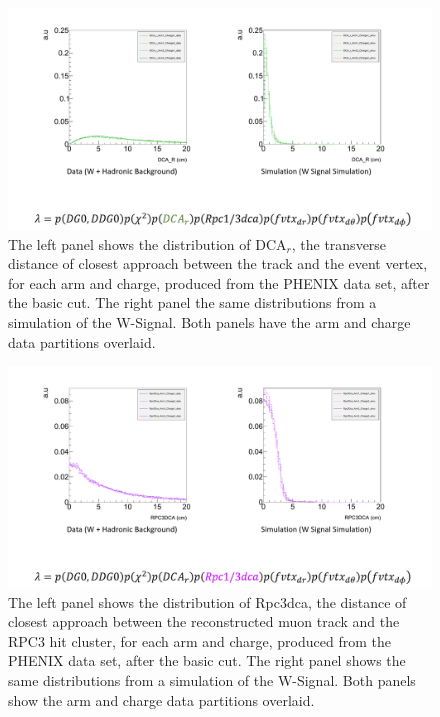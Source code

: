 \begin{figure}[h!]
  \centering
  \includegraphics[width=\linewidth,trim=4 70 4 4,clip]{./figures/pdf_dcar.png}
  \caption{
    The left panel shows the distribution of DCA$_r$, the transverse distance of
    closest approach between the track and the event vertex, for each arm and
    charge, produced from the PHENIX data set, after the basic cut. The right
    panel the same distributions from a simulation of the W-Signal. Both panels
    have the arm and charge data partitions overlaid.
  }
\end{figure}
\clearpage

\begin{figure}[h!]
  \centering
  \includegraphics[width=\linewidth,trim=4 70 4 4,clip]{./figures/pdf_rpc3dca.png}
  \caption{
    The left panel shows the distribution of Rpc3dca, the distance of closest
    approach between the reconstructed muon track and the RPC3 hit cluster, for
    each arm and charge, produced from the PHENIX data set, after the basic cut.
    The right panel shows the same distributions from a simulation of the
    W-Signal. Both panels show the arm and charge data partitions overlaid.
  }
  \label{fig:pdf_rpc3dca}
\end{figure}
\clearpage


